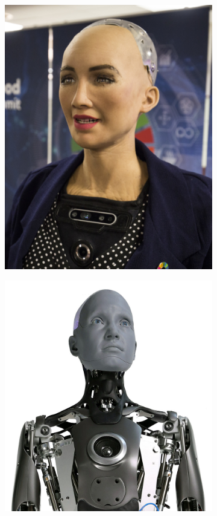 \begin{figure}[h]
    \centering
    \begin{subfigure}{0.3\linewidth}
        \includegraphics[width=\linewidth]{Thesis/ch1/sophia.jpg}
    \end{subfigure}
    \begin{subfigure}{0.3\linewidth}
        \includegraphics[width=\linewidth]{Thesis/ch1/Ameca_Generation_1.jpg}

\end{subfigure}
\end{figure}
